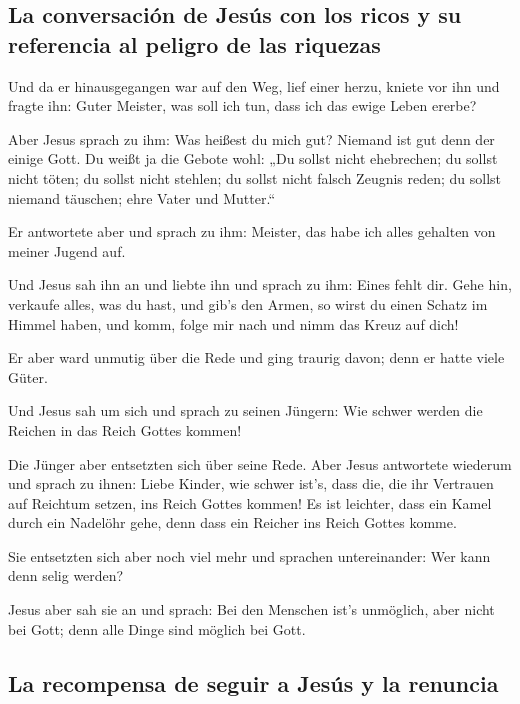 \hypertarget{la-conversaciuxf3n-de-jesuxfas-con-los-ricos-y-su-referencia-al-peligro-de-las-riquezas}{%
\subsection{La conversación de Jesús con los ricos y su referencia al
peligro de las
riquezas}\label{la-conversaciuxf3n-de-jesuxfas-con-los-ricos-y-su-referencia-al-peligro-de-las-riquezas}}

 Und da er hinausgegangen war auf den Weg, lief einer
herzu, kniete vor ihn und fragte ihn: Guter Meister, was soll ich tun,
dass ich das ewige Leben ererbe?

 Aber Jesus sprach zu ihm: Was heißest du mich gut?
Niemand ist gut denn der einige Gott.  Du weißt ja die
Gebote wohl: „Du sollst nicht ehebrechen; du sollst nicht töten; du
sollst nicht stehlen; du sollst nicht falsch Zeugnis reden; du sollst
niemand täuschen; ehre Vater und Mutter.``

 Er antwortete aber und sprach zu ihm: Meister, das habe
ich alles gehalten von meiner Jugend auf.

 Und Jesus sah ihn an und liebte ihn und sprach zu ihm:
Eines fehlt dir. Gehe hin, verkaufe alles, was du hast, und gib's den
Armen, so wirst du einen Schatz im Himmel haben, und komm, folge mir
nach und nimm das Kreuz auf dich!

 Er aber ward unmutig über die Rede und ging traurig
davon; denn er hatte viele Güter.

 Und Jesus sah um sich und sprach zu seinen Jüngern: Wie
schwer werden die Reichen in das Reich Gottes kommen!

 Die Jünger aber entsetzten sich über seine Rede. Aber
Jesus antwortete wiederum und sprach zu ihnen: Liebe Kinder, wie schwer
ist's, dass die, die ihr Vertrauen auf Reichtum setzen, ins Reich Gottes
kommen!  Es ist leichter, dass ein Kamel durch ein
Nadelöhr gehe, denn dass ein Reicher ins Reich Gottes komme.

 Sie entsetzten sich aber noch viel mehr und sprachen
untereinander: Wer kann denn selig werden?

 Jesus aber sah sie an und sprach: Bei den Menschen ist's
unmöglich, aber nicht bei Gott; denn alle Dinge sind möglich bei Gott.

\hypertarget{la-recompensa-de-seguir-a-jesuxfas-y-la-renuncia}{%
\subsection{La recompensa de seguir a Jesús y la
renuncia}\label{la-recompensa-de-seguir-a-jesuxfas-y-la-renuncia}}

